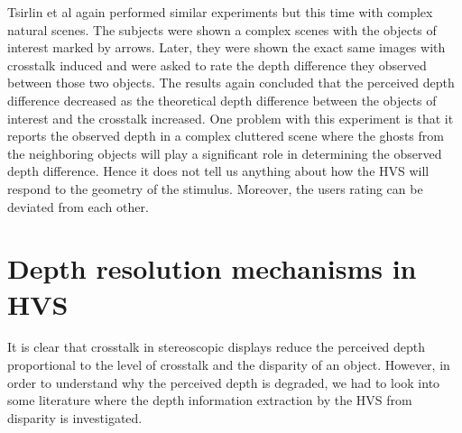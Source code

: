 Tsirlin et al \cite{tsirlin2012crosstalk} again performed similar experiments but this time with complex natural scenes. The subjects were shown a complex scenes with the objects of interest marked by arrows. Later, they were shown the exact same images with crosstalk induced and were asked to rate the depth difference they observed between those two objects. The results again concluded that the perceived depth difference decreased as the theoretical depth difference between the objects of interest and the crosstalk increased. One problem with this experiment is that it reports the observed depth in a complex cluttered scene where the ghosts from the neighboring objects will play a significant role in determining the observed depth difference. Hence it does not tell us anything about how the HVS will respond to the geometry of the stimulus. Moreover, the users rating can be deviated from each other.

\section{Depth resolution mechanisms in HVS}
It is clear that crosstalk in stereoscopic displays reduce the perceived depth proportional to the level of crosstalk and the disparity of an object. However, in order to understand why the perceived depth is degraded, we had to look into some literature where the depth information extraction by the HVS from disparity is investigated.

